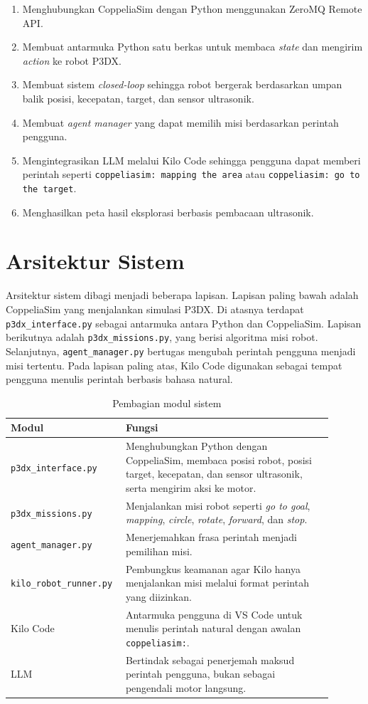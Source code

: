 \documentclass{article}
\begin{document}
\begin{enumerate}[itemsep=0.2em]
    \item Menghubungkan CoppeliaSim dengan Python menggunakan ZeroMQ Remote API.
    \item Membuat antarmuka Python satu berkas untuk membaca \textit{state} dan mengirim \textit{action} ke robot P3DX.
    \item Membuat sistem \textit{closed-loop} sehingga robot bergerak berdasarkan umpan balik posisi, kecepatan, target, dan sensor ultrasonik.
    \item Membuat \textit{agent manager} yang dapat memilih misi berdasarkan perintah pengguna.
    \item Mengintegrasikan LLM melalui Kilo Code sehingga pengguna dapat memberi perintah seperti \texttt{coppeliasim: mapping the area} atau \texttt{coppeliasim: go to the target}.
    \item Menghasilkan peta hasil eksplorasi berbasis pembacaan ultrasonik.
\end{enumerate}

\section{Arsitektur Sistem}

Arsitektur sistem dibagi menjadi beberapa lapisan. Lapisan paling bawah adalah CoppeliaSim yang menjalankan simulasi P3DX. Di atasnya terdapat \texttt{p3dx\_interface.py} sebagai antarmuka antara Python dan CoppeliaSim. Lapisan berikutnya adalah \texttt{p3dx\_missions.py}, yang berisi algoritma misi robot. Selanjutnya, \texttt{agent\_manager.py} bertugas mengubah perintah pengguna menjadi misi tertentu. Pada lapisan paling atas, Kilo Code digunakan sebagai tempat pengguna menulis perintah berbasis bahasa natural.

\begin{table}[H]
\centering
\caption{Pembagian modul sistem}
\begin{tabular}{@{}p{0.28\linewidth}p{0.62\linewidth}@{}}
\toprule
\textbf{Modul} & \textbf{Fungsi} \\
\midrule
\texttt{p3dx\_interface.py} & Menghubungkan Python dengan CoppeliaSim, membaca posisi robot, posisi target, kecepatan, dan sensor ultrasonik, serta mengirim aksi ke motor. \\
\texttt{p3dx\_missions.py} & Menjalankan misi robot seperti \textit{go to goal}, \textit{mapping}, \textit{circle}, \textit{rotate}, \textit{forward}, dan \textit{stop}. \\
\texttt{agent\_manager.py} & Menerjemahkan frasa perintah menjadi pemilihan misi. \\
\texttt{kilo\_robot\_runner.py} & Pembungkus keamanan agar Kilo hanya menjalankan misi melalui format perintah yang diizinkan. \\
Kilo Code & Antarmuka pengguna di VS Code untuk menulis perintah natural dengan awalan \texttt{coppeliasim:}. \\
LLM & Bertindak sebagai penerjemah maksud perintah pengguna, bukan sebagai pengendali motor langsung. \\
\bottomrule
\end{tabular}
\end{table}
\end{document}
